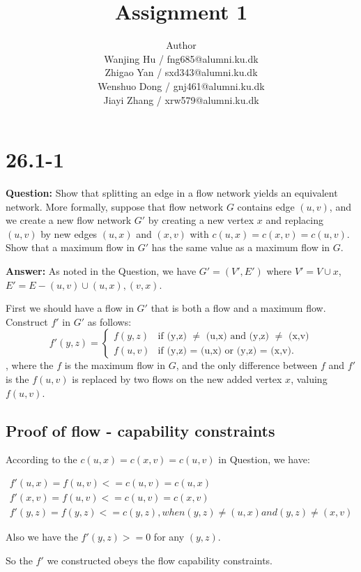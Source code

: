 \documentclass[12pt]{article}
\title{Assignment 1}
\author{Author \\
  Wanjing Hu / fng685@alumni.ku.dk  \\
  Zhigao Yan / sxd343@alumni.ku.dk  \\
  Wenshuo Dong / gnj461@alumni.ku.dk  \\
  Jiayi Zhang / xrw579@alumni.ku.dk \\
}
\begin{document}
\maketitle


\section{26.1-1}
\textbf{Question: }Show that splitting an edge in a flow network yields an equivalent network. More formally, suppose that flow network $G$ contains edge $(u, v)$, and we create a new flow network $G'$ by creating a new vertex $x$ and replacing $(u, v)$ by new edges $(u, x)$ and $(x, v)$ with $c(u, x) = c(x, v) = c(u, v)$. Show that a maximum flow in $G'$ has the same value as a maximum flow in $G$.

\textbf{Answer: }As noted in the Question, we have $G'=(V',E')$ where $V'=V\cup{x}$, $E'=E-{(u,v)}\cup{(u,x), (v, x)}$.

First we should have a flow in $G'$ that is both a flow and a maximum flow. Construct $f'$ in $G'$ as follows:
\begin{equation}
f'(y,z) = 
\begin{cases}
f(y,z) &\mbox{if (y,z) $\neq$ (u,x) and (y,z) $\neq$ (x,v)}\\
f(u,v) &\mbox{if (y,z) = (u,x) or (y,z) = (x,v)}.
\end{cases}
\end{equation}
, where the $f$ is the maximum flow in $G$, and the only difference between $f$ and $f'$ is the $f(u,v)$ is replaced by two flows on the new added vertex $x$, valuing $f(u,v)$.

\subsection{Proof of flow - capability constraints}

According to the $c(u, x) = c(x, v) = c(u, v)$ in Question, we have:

\begin{gather}
f'(u,x) = f(u,v) <= c(u,v) = c(u,x)\\ \nonumber
f'(x,v) = f(u,v)<=c(u,v) = c(x,v)\\ \nonumber
f'(y,z) = f(y,z) <= c(y,z), when (y,z) \neq (u,x) and (y,z) \neq (x,v) \nonumber
\end{gather}

Also we have the $f'(y,z)>= 0$ for any $(y,z)$.

So the $f'$ we constructed obeys the flow capability constraints.
\end{document}
